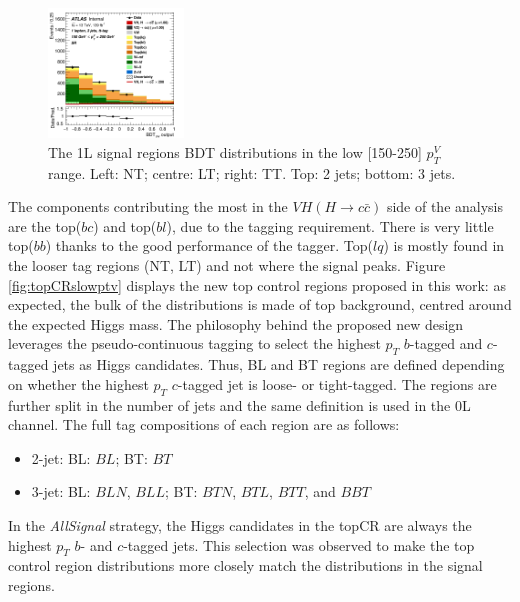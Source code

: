 \begin{figure}[h!]
\includegraphics[width=0.32\textwidth]{Images/VH/SRsandTopCRs/Region_distmva_DSR_BMax250_L1_Y6051_TTypett_T2_J3_BMin150_Prefit.png}
\caption{The 1L signal regions BDT distributions in the low [150-250] $p_T^V$ range. Left: NT; centre: LT; right: TT. Top: 2 jets; bottom: 3 jets.} 
\label{fig:SRslowptv}
\end{figure}

The components contributing the most in the $VH(H\rightarrow c\bar{c})$ side of the analysis are the top($bc$) and top($bl$), due to the tagging requirement. There is very little top($bb$) thanks to the good performance of the tagger. Top($lq$) is mostly found in the looser tag regions (NT, LT) and not where the signal peaks. Figure \ref{fig:topCRslowptv} displays the new top control regions proposed in this work: as expected, the bulk of the distributions is made of top background, centred around the expected Higgs mass. The philosophy behind the proposed new design leverages the pseudo-continuous tagging to select the highest $p_T$ $b$-tagged and $c$-tagged jets as Higgs candidates. Thus, BL and BT regions are defined depending on whether the highest $p_T$ $c$-tagged jet is loose- or tight-tagged. The regions are further split in the number of jets and the same definition is used in the 0L channel. The full tag compositions of each region are as follows:

\begin{itemize}
\item 2-jet: \quad BL: $BL$;  \quad BT: $BT$
\item 3-jet:  \quad BL: $BLN$, $BLL$;  \quad BT: $BTN$, $BTL$, $BTT$, and $BBT$
\end{itemize}
In the \textit{AllSignal} strategy, the Higgs candidates in the topCR are always the highest $p_T$ $b$- and $c$-tagged jets. This selection was observed to make the top control region distributions more closely match the distributions in the signal regions. \\

